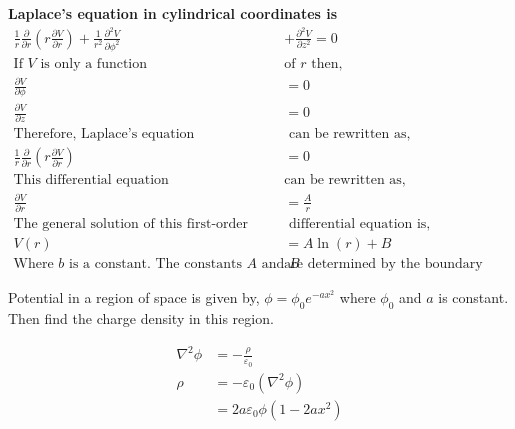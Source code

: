 \begin{note}
	\textbf{Laplace's equation in cylindrical coordinates is}
	\begin{align*}
	\frac{1}{r} \frac{\partial}{\partial r}\left(r \frac{\partial V}{\partial r}\right)+\frac{1}{r^{2}} \frac{\partial^{2} V}{\partial \phi^{2}}&+\frac{\partial^{2} V}{\partial z^{2}}=0\\
	\text{If $V$ is only a function  }&\text{of $r$ then,}\\
	\frac{\partial V}{\partial \phi}&=0 \\
	\frac{\partial V}{\partial z}&=0\\
	\text{Therefore, Laplace's equation}&\text{ can be rewritten as,}\\
	\frac{1}{r} \frac{\partial}{\partial r}\left(r \frac{\partial V}{\partial r}\right)&=0\\
	\text{This differential equation }&\text{can be rewritten as,}\\
	\frac{\partial V}{\partial r}&=\frac{A}{r}\\
	\text{The general solution of this first-order}&\text{ differential equation is,}\\
	V(r)&=A \ln (r)+B\\
	\text{Where $b$ is a constant. The constants $A$ and $B$ }&\text{are determined by the boundary conditions. }
	\end{align*}
	\begin{center}
	\end{center}	
\end{note}
\begin{exercise}
	Potential in a region of space is given by, $\phi=\phi_{0} e^{-a x^{2}}$ where $\phi_{0}$ and $a$ is constant. Then
	find the charge density in this region.
\end{exercise}
\begin{answer}
	\begin{align*}
	\nabla^{2} \phi&=-\frac{\rho}{\varepsilon_{0}} \\ \rho&=-\varepsilon_{0}\left(\nabla^{2} \phi\right)\\
	&=2 a \varepsilon_{0} \phi\left(1-2 a x^{2}\right)
	\end{align*}
\end{answer}

